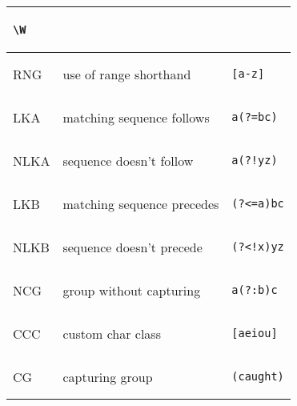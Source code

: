 \begin{xtabular}{lll}
\begin{minipage}{0.5in}
\begin{verbatim}
\W
\end{verbatim}\end{minipage} \\
\midrule
RNG & use of range shorthand &
\begin{minipage}{0.5in}\begin{verbatim}
[a-z]
\end{verbatim}\end{minipage} \\
\midrule
LKA & matching sequence follows &
\begin{minipage}{0.5in}\begin{verbatim}
a(?=bc)
\end{verbatim}\end{minipage} \\
\midrule
NLKA & sequence doesn't follow &
\begin{minipage}{0.5in}\begin{verbatim}
a(?!yz)
\end{verbatim}\end{minipage} \\
\midrule
LKB & matching sequence precedes &
\begin{minipage}{0.5in}\begin{verbatim}
(?<=a)bc
\end{verbatim}\end{minipage} \\
\midrule
NLKB & sequence doesn't precede &
\begin{minipage}{0.5in}\begin{verbatim}
(?<!x)yz
\end{verbatim}\end{minipage} \\
\midrule
NCG & group without capturing &
\begin{minipage}{0.5in}\begin{verbatim}
a(?:b)c
\end{verbatim}\end{minipage} \\
\midrule
CCC & custom char class &
\begin{minipage}{0.5in}\begin{verbatim}
[aeiou]
\end{verbatim}\end{minipage} \\
\midrule
CG & capturing group &
\begin{minipage}{0.5in}\begin{verbatim}
(caught)
\end{verbatim}\end{minipage} \\

\end{xtabular}
